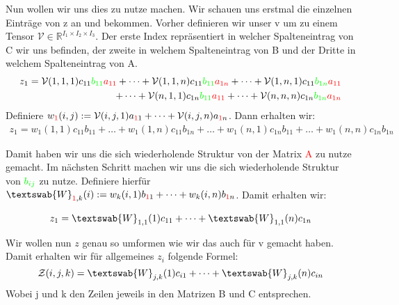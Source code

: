 Nun wollen wir uns dies zu nutze machen. Wir schauen uns erstmal die einzelnen Einträge von z an und bekommen. Vorher definieren wir unser v um zu einem Tensor $\mathcal{V} \in \mathbb{R}^{I_1 \times I_2 \times I_3} $. Der erste Index repräsentiert in welcher Spalteneintrag von C wir uns befinden, der zweite in welchem Spalteneintrag von B und der Dritte in welchem Spalteneintrag von A. 
\begin{equation} \label{eq:zold}
\begin{aligned}
z_{1} = \mathcal{V}(1,1,1) c_{11} \textcolor{green}{b_{11}} \textcolor{red}{a_{11}}+ \dots +  \mathcal{V}(1,1,n) c_{11} \textcolor{green}{b_{11}} \textcolor{red}{a_{1n}} + \dots  +  \mathcal{V}(1,n,1)c_{11} 
\textcolor{green}{b_{1n}} \textcolor{red}{a_{11}} \\ + \dots +  \mathcal{V}(n,1,1) c_{1n} \textcolor{green}{b_{11}} \textcolor{red}{a_{11}} + \dots +  \mathcal{V}(n,n,n) c_{1n} \textcolor{green}{b_{1n}} \textcolor{red}{a_{1n}}
\end{aligned}
\end{equation}
Definiere $w_{\textcolor{red}{1}}(i,j) :=\mathcal{V}(i,j,1) a_{\textcolor{red}{1}1}+\dots+\mathcal{V}(i,j,n) a_{\textcolor{red}{1}n}$. Dann erhalten wir:
\begin{equation*}
\begin{aligned}
z_{1}= w_1(1,1) c_{11} b_{11} + \dots +   w_1(1,n) c_{11} b_{1n} + \dots + w_1(n,1) c_{1n} b_{11}  + \dots +  w_1(n,n) c_{1n} b_{1n} 
\end{aligned}
\end{equation*}

Damit haben wir uns die sich wiederholende Struktur von der Matrix \textcolor{red}{A} zu nutze gemacht. Im nächsten Schritt machen wir uns die sich wiederholende Struktur von $\textcolor{green}{b_{ij}}$ zu nutze.
Definiere hierfür $\textswab{W}_{\textcolor{red}{1},k} (i):= w_k(i,1) b_{\textcolor{red}{1}1} + \dots + w_k(i,n) b_{\textcolor{red}{1}n}$. Damit erhalten wir:

\begin{equation} \label{eq:znew}
\begin{aligned}
z_{1}= \textswab{W}_{1,1}(1) c_{11}  + \dots +  \textswab{W}_{1,1}(n) c_{1n} 
\end{aligned}
\end{equation}

Wir wollen nun $z$ genau so umformen wie wir das auch für v gemacht haben. Damit erhalten wir für allgemeines $z_{i}$ folgende Formel:
\begin{equation}
\mathcal{Z}(i,j,k) = \textswab{W}_{j,k}(1) c_{i1}  + \dots +  \textswab{W}_{j,k}(n) c_{in} 
\end{equation}
Wobei j und k den Zeilen jeweils in den Matrizen B und C entsprechen. 

